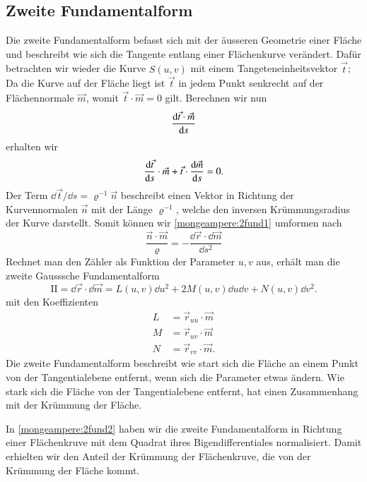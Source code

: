 \subsection{Zweite Fundamentalform}
Die zweite Fundamentalform befasst sich mit der äusseren Geometrie einer 
Fläche und beschreibt wie sich die Tangente entlang einer Flächenkurve verändert.
Dafür betrachten wir wieder die Kurve $S(u,v)$ mit einem Tangeteneinheitsvektor 
$\vec t$;
Da die Kurve auf der Fläche liegt ist $\vec t$ in jedem Punkt senkrecht auf der 
Flächennormale $\vec m$, womit $\vec t \cdot \vec m = 0$ gilt. 
Berechnen wir nun 
\begin{equation}
  \dv{\vec t \cdot \vec m}{s}
  \label{mongeampere:2fund0}
\end{equation}
erhalten wir 
\begin{equation}
  \dv{\vec t}{s} \cdot \vec m + \vec t \cdot \dv{\vec m}{s} = 0. 
  \label{mongeampere:2fund1}
\end{equation}
Der Term $\dd \vec t / \dd s = \varrho^{-1} \vec n$ beschreibt einen Vektor in Richtung der Kurvennormalen 
$\vec n$ mit der Länge $\varrho^{-1}$, welche den inversen Krümmungsradius der Kurve 
darstellt.
Somit können wir \eqref{mongeampere:2fund1} umformen nach
\begin{equation}
  \frac{\vec n \cdot \vec m}{\varrho} = - \frac{\dd \vec r \cdot \dd \vec m }{\dd s^2} 
  \label{mongeampere:2fund2}
\end{equation}
Rechnet man den Zähler als Funktion der Parameter $u, v$ aus, erhält man die zweite 
Gausssche Fundamentalform
\begin{equation}
  \mathrm{I\!I} = \dd \vec r \cdot \dd \vec m  = L(u, v) \dd u^2 + 2 M (u,v) \dd u \dd v + N(u,v) \dd v^2.
  \label{mongeampere:2fund}
\end{equation}
mit den Koeffizienten
\begin{align*}
  L &= \vec r_{uu} \cdot \vec m \\ 
  M &= \vec r_{uv} \cdot \vec m \\
  N &= \vec r_{vv} \cdot \vec m.
  \label{mongeampere:2fundkoef}
\end{align*}
Die zweite Fundamentalform beschreibt wie start sich die Fläche an einem Punkt
von der Tangentialebene entfernt, wenn sich die Parameter etwas ändern.
Wie stark sich die Fläche von der Tangentialebene entfernt, hat einen Zusammenhang mit der Krümmung der Fläche.

In \eqref{mongeampere:2fund2} haben wir die zweite Fundamentalform in Richtung einer Flächenkruve mit
dem Quadrat ihres Bigendifferentiales normalisiert.
Damit erhielten wir den Anteil der Krümmung der Flächenkruve, die von der Krümmung der Fläche kommt.

